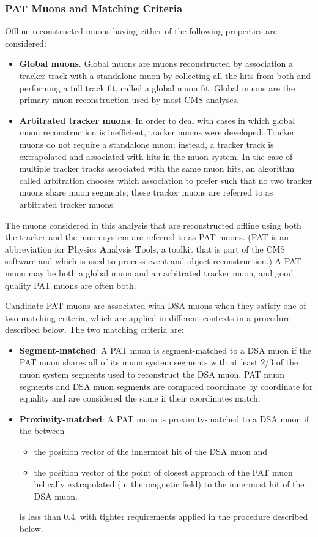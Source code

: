 \subsubsection{PAT Muons and Matching Criteria}
Offline reconstructed muons having either of the following properties are considered:
\begin{itemize}
  \item \textbf{Global muons}. Global muons are muons reconstructed by association a tracker track with a standalone muon by collecting all the hits from both and performing a full track fit, called a global muon fit. Global muons are the primary muon reconstruction used by most CMS analyses.
  \item \textbf{Arbitrated tracker muons}. In order to deal with cases in which global muon reconstruction is inefficient, tracker muons were developed. Tracker muons do not require a standalone muon; instead, a tracker track is extrapolated and associated with hits in the muon system. In the case of multiple tracker tracks associated with the same muon hits, an algorithm called arbitration chooses which association to prefer such that no two tracker muons share muon segments; these tracker muons are referred to as arbitrated tracker muons.
\end{itemize}
The muons considered in this analysis that are reconstructed offline using both the tracker and the muon system are referred to as PAT muons.
(PAT is an abbreviation for \textbf{P}hysics \textbf{A}nalysis \textbf{T}ools, a toolkit that is part of the CMS software and which is used to process event and object reconstruction.)
A PAT muon may be both a global muon and an arbitrated tracker muon, and good quality PAT muons are often both.

Candidate PAT muons are associated with DSA muons when they satisfy one of two matching criteria, which are applied in different contexts in a procedure described below. The two matching criteria are:
\begin{itemize}
  \item \textbf{Segment-matched}: A PAT muon is segment-matched to a DSA muon if the PAT muon shares all of its muon system segments with at least 2/3 of the muon system segments used to reconstruct the DSA muon. PAT muon segments and DSA muon segments are compared coordinate by coordinate for equality and are considered the same if their coordinates match.
  \item \textbf{Proximity-matched}: A PAT muon is proximity-matched to a DSA muon if the \deltaR between
    \begin{itemize}
      \item the position vector of the innermost hit of the DSA muon and
      \item the position vector of the point of closest approach of the PAT muon helically extrapolated (in the magnetic field) to the innermost hit of the DSA muon.
    \end{itemize}
    is less than 0.4, with tighter requirements applied in the procedure described below.
\end{itemize}

